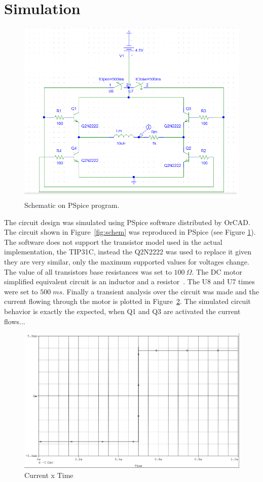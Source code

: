 \section{\textbf{Simulation}}\label{sec:3}

\begin{figure}[t]
    \centering
    \includegraphics[height=.5\textwidth]{img/schem_pspice.png}
    \caption{Schematic on PSpice program.}\label{fig:schem_pspice}%
\end{figure}

    The circuit design was simulated using PSpice software distributed by OrCAD. The circuit shown in Figure~\ref{fig:schem} was reproduced in PSpice (see Figure \ref{fig:schem_pspice}). The software does not support the transistor model used in the actual implementation, the TIP31C, instead the Q2N2222 was used to replace it given they are very similar, only the maximum supported values for voltages change. The value of all transistors base resistances was set to $100\:\Omega$. The DC motor simplified equivalent circuit is an inductor and a resistor~\cite{CHAPMAN}. The U8 and U7 times were set to $500\; ms$.
	Finally a transient analysis over the circuit was made and the current flowing through the motor is plotted in Figure~\ref{fig:plot_ponteh}. The simulated circuit behavior is exactly the expected, when Q1 and Q3 are activated the current flows... 
	
	
\begin{figure}
\centering
\includegraphics[height=.5\textwidth]{img/plot.png}
\caption{Current x Time} \label{fig:plot_ponteh}
\end{figure}	
